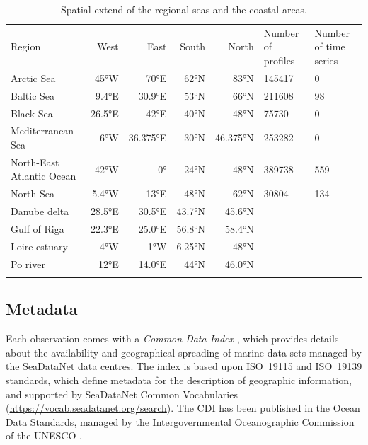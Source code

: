 \documentclass[essd, manuscript]{copernicus}
\begin{document}
\begin{table}[h!]
\caption{Spatial extend of the regional seas and the coastal areas.\label{tab:regions}}
\begin{tabular}{lrrrrll}
\tophline
Region	 					& West		& East		& South 		& North 		& Number of profiles	& Number of time series\\ 
\middlehline	
Arctic Sea 					& 45°W 		& 70°E		& 62°N		& 83°N		& 145417		& 0		\\
Baltic Sea					& 9.4°E		& 30.9°E		& 53°N		& 66°N		& 211608		& 98		\\
Black Sea					& 26.5°E 	& 42°E		& 40°N		& 48°N	 	& 75730		& 0		\\
Mediterranean Sea			& 6°W		& 36.375°E	& 30°N		& 46.375°N	& 253282		& 0		\\
North-East Atlantic Ocean 	& 42°W		& 0° 		& 24°N		& 48°N		& 389738		& 559	\\
North Sea 					& 5.4°W 		& 13°E		& 48°N		& 62°N		& 30804		& 134	\\
\middlehline	
Danube delta				& 28.5°E		& 30.5°E		& 43.7°N 	& 45.6°N		&			& \\
Gulf of Riga 				& 22.3°E 	& 25.0°E 	& 56.8°N 	& 58.4°N		&			& \\
Loire estuary				& 4°W		& 1°W 		& 6.25°N		& 48°N		&			& \\
Po river					 & 12°E		& 14.0°E		& 44°N		& 46.0°N		&			& \\
\bottomhline
\end{tabular}
\end{table}

\subsection{Metadata\label{sec:metadata}}

Each observation comes with a \textit{Common Data Index} \citep[CDI,][]{Schaap2021,Schaap2022}, which provides details about the availability and geographical spreading of marine data sets managed by the SeaDataNet data centres. The index is based upon ISO~19115 and ISO~19139 standards, which define metadata for the description of geographic information, and supported by SeaDataNet Common Vocabularies (\url{https://vocab.seadatanet.org/search}). The CDI has been published in the Ocean Data Standards, managed by the Intergovernmental Oceanographic Commission of the UNESCO \citet{Schaap2021}.
\end{document}
